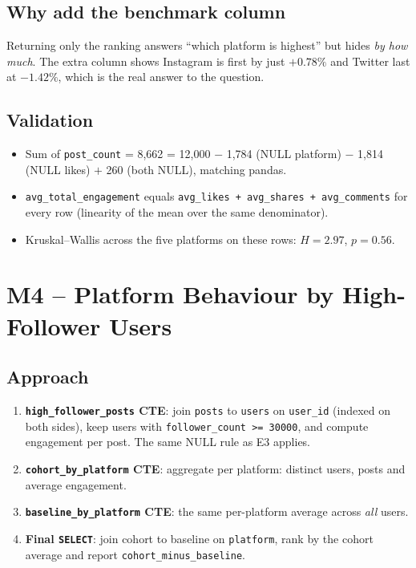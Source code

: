 \documentclass[11pt,a4paper]{article}
\begin{document}
\subsection{Why add the benchmark column}
Returning only the ranking answers ``which platform is highest'' but hides \emph{by how much}. The extra column shows Instagram is first by just $+0.78\%$ and Twitter last at $-1.42\%$, which is the real answer to the question.

\subsection{Validation}
\begin{itemize}[leftmargin=*]
  \item Sum of \texttt{post\_count} = 8,662 = 12,000 $-$ 1,784 (NULL platform) $-$ 1,814 (NULL likes) $+$ 260 (both NULL), matching pandas.
  \item \texttt{avg\_total\_engagement} equals \texttt{avg\_likes + avg\_shares + avg\_comments} for every row (linearity of the mean over the same denominator).
  \item Kruskal--Wallis across the five platforms on these rows: $H = 2.97$, $p = 0.56$.
\end{itemize}

\section{M4 -- Platform Behaviour by High-Follower Users}

\subsection{Approach}
\begin{enumerate}[leftmargin=*]
  \item \textbf{\texttt{high\_follower\_posts} CTE}: join \texttt{posts} to \texttt{users} on \texttt{user\_id} (indexed on both sides), keep users with \texttt{follower\_count >= 30000}, and compute engagement per post. The same NULL rule as E3 applies.
  \item \textbf{\texttt{cohort\_by\_platform} CTE}: aggregate per platform: distinct users, posts and average engagement.
  \item \textbf{\texttt{baseline\_by\_platform} CTE}: the same per-platform average across \emph{all} users.
  \item \textbf{Final \texttt{SELECT}}: join cohort to baseline on \texttt{platform}, rank by the cohort average and report \texttt{cohort\_minus\_baseline}.
\end{enumerate}
\end{document}
